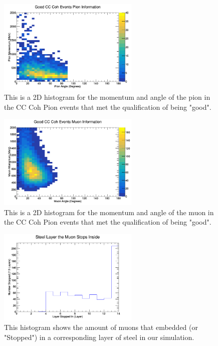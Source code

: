 \documentclass[11pt]{article}
\begin{document}
\begin{figure}[H]
\centering
\includegraphics[width=0.6\textwidth]{OldNMReinSehgalImages/5-GoodCCCohPionInfoNMORS.png}
\caption{This is a 2D histogram for the momentum and angle of the pion in the CC Coh Pion events that met the qualification of being "good".}
\end{figure}

\begin{figure}[H]
\centering
\includegraphics[width=0.6\textwidth]{OldNMReinSehgalImages/6-GoodCCCohMuonInfoNMORS.png}
\caption{This is a 2D histogram for the momentum and angle of the muon in the CC Coh Pion events that met the qualification of being "good".}
\end{figure}

\begin{figure}[H]
\centering
\includegraphics[width=0.6\textwidth]{OldNMReinSehgalImages/7-LayerPenetrationNMORS.png}
\caption{This histogram shows the amount of muons that embedded (or "Stopped") in a corresponding layer of steel in our simulation.}
\end{figure}
\end{document}
